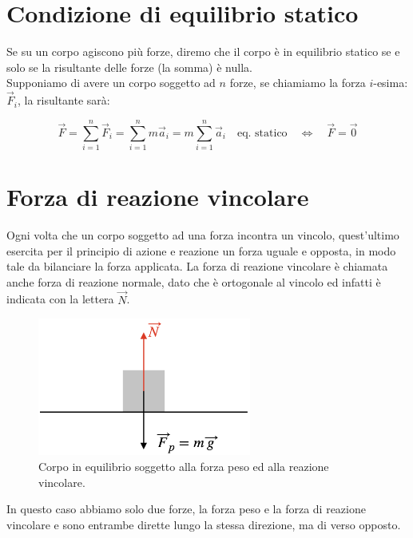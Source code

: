 \section{Condizione di equilibrio statico}
Se su un corpo agiscono più forze, diremo che il corpo è in equilibrio statico se e solo se la risultante delle forze (la somma) è nulla.\\ Supponiamo di avere un corpo soggetto ad $n$ forze, se chiamiamo la forza $i$-esima: $\vec F_i$, la risultante sarà:




\begin{equation}
\vec F = \sum_{i=1}^n\vec F_i =  \sum_{i=1}^n m\vec a_i = m \sum_{i=1}^n \vec a_i\quad\mbox{eq. statico}\quad\Leftrightarrow \quad\vec F = \vec 0
\end{equation}




\section{Forza di reazione vincolare}
Ogni volta che un corpo soggetto ad una forza incontra un vincolo, quest'ultimo esercita per il principio di azione e reazione un forza uguale e opposta, in modo tale da bilanciare la forza applicata. La forza di reazione vincolare è chiamata anche forza di reazione normale, dato che è ortogonale al vincolo ed infatti è indicata con la lettera $\vec N$.




\begin{figure}[htbp]
\begin{center}
\includegraphics[width=7cm]{images/NP.png}
\caption{Corpo in equilibrio soggetto alla forza peso ed  alla reazione vincolare.}
\label{default}
\end{center}
\end{figure}

In questo caso abbiamo solo due forze, la forza peso e la forza di reazione vincolare e sono entrambe dirette lungo la stessa direzione, ma di verso opposto.

